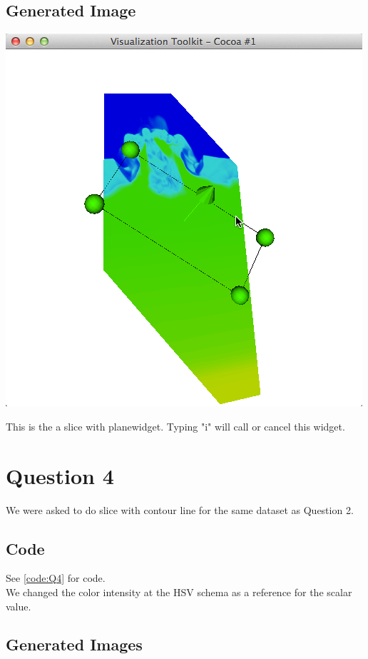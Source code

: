 \documentclass[11pt]{scrartcl}
\begin{document}
\subsection{Generated Image}
\begin{minipage}[t]{\linewidth}
{
\includegraphics[scale = 0.7]{img_3.png}

\centering
\medskip
{\footnotesize This is the a slice with planewidget. Typing "i" will call or cancel this widget. }
}
\end{minipage}

\section{Question 4}
We were asked to do slice with contour line for the same dataset as Question 2.
\subsection{Code}
See \ref{code:Q4} for code.\\

We changed the color intensity at the HSV schema as a reference for the scalar value.
\subsection{Generated Images}
\end{document}
